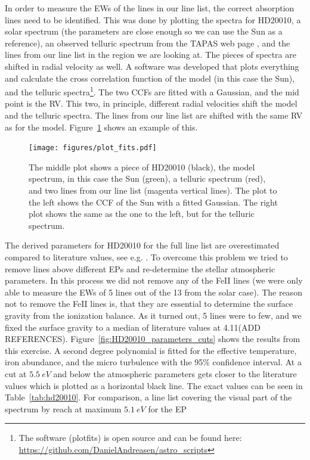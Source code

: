 \documentclass{aa}
\begin{document}
In order to measure the EWs of the lines in our line list, the correct
absorption lines need to be identified. This was done by plotting
the spectra for HD20010, a solar spectrum (the parameters are close
enough so we can use the Sun as a reference), an observed telluric
spectrum from the TAPAS web page \citep{Bertaux2014}, and the lines from our
line list in the region we are looking at. The pieces of spectra are
shifted in radial velocity as well. A software was developed that plots
everything and calculate the cross correlation function of the model
(in this case the Sun), and the telluric spectra\footnote{The software
(plot\textunderscore{}fits) is open source and can be found here:
\url{https://github.com/DanielAndreasen/astro_scripts}}. The two CCFs
are fitted with a Gaussian, and the mid point is the RV. This two, in
principle, different radial velocities shift the model and the telluric
spectra. The lines from our line list are shifted with the same RV as for
the model. Figure~\ref{fig:plot_fits} shows an example of this.

\begin{figure}[tbp!]
    \centering
    \texttt{[image: figures/plot\_fits.pdf]}
    \caption{The middle plot shows a piece of HD20010 (black), the model
    spectrum, in this case the Sun (green), a telluric spectrum (red), and two
    lines from our line list (magenta vertical lines). The plot to the left
    shows the CCF of the Sun with a fitted Gaussian. The right plot shows the
    same as the one to the left, but for the telluric spectrum.}
    \label{fig:plot_fits}
\end{figure}

The derived parameters for HD20010 for the full line list
are overestimated compared to literature values, see e.g.
\citet{Mortier2013,Lebzelter2012}. To overcome this problem we tried
to remove lines above different EPs and re-determine the stellar
atmospheric parameters. In this process we did not remove any of the
FeII lines (we were only able to measure the EWs of 5 lines out of
the 13 from the solar case). The reason not to remove the FeII lines
is, that they are essential to determine the surface gravity from the
ionization balance. As it turned out, 5 lines were to few, and we
fixed the surface gravity to a median of literature values at 4.11(ADD
REFERENCES). Figure~\ref{fig:HD20010_parameters_cuts} shows the results
from this exercise. A second degree polynomial is fitted for the
effective temperature, iron abundance, and the micro turbulence with
the 95\% confidence interval. At a cut at $\SI{5.5}{eV}$ and below
the atmospheric parameters gets closer to the literature values which
is plotted as a horizontal black line. The exact values can be seen
in Table~\ref{tab:hd20010}. For comparison, a line list covering the
visual part of the spectrum by \cite{Tsantaki2013} reach at maximum
$\SI{5.1}{eV}$ for the EP
\end{document}
